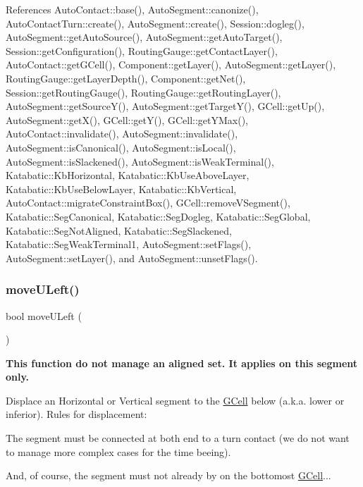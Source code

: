 References Auto\+Contact\+::base(), Auto\+Segment\+::canonize(), Auto\+Contact\+Turn\+::create(), Auto\+Segment\+::create(), Session\+::dogleg(), Auto\+Segment\+::get\+Auto\+Source(), Auto\+Segment\+::get\+Auto\+Target(), Session\+::get\+Configuration(), Routing\+Gauge\+::get\+Contact\+Layer(), Auto\+Contact\+::get\+G\+Cell(), Component\+::get\+Layer(), Auto\+Segment\+::get\+Layer(), Routing\+Gauge\+::get\+Layer\+Depth(), Component\+::get\+Net(), Session\+::get\+Routing\+Gauge(), Routing\+Gauge\+::get\+Routing\+Layer(), Auto\+Segment\+::get\+Source\+Y(), Auto\+Segment\+::get\+Target\+Y(), G\+Cell\+::get\+Up(), Auto\+Segment\+::get\+X(), G\+Cell\+::get\+Y(), G\+Cell\+::get\+Y\+Max(), Auto\+Contact\+::invalidate(), Auto\+Segment\+::invalidate(), Auto\+Segment\+::is\+Canonical(), Auto\+Segment\+::is\+Local(), Auto\+Segment\+::is\+Slackened(), Auto\+Segment\+::is\+Weak\+Terminal(), Katabatic\+::\+Kb\+Horizontal, Katabatic\+::\+Kb\+Use\+Above\+Layer, Katabatic\+::\+Kb\+Use\+Below\+Layer, Katabatic\+::\+Kb\+Vertical, Auto\+Contact\+::migrate\+Constraint\+Box(), G\+Cell\+::remove\+V\+Segment(), Katabatic\+::\+Seg\+Canonical, Katabatic\+::\+Seg\+Dogleg, Katabatic\+::\+Seg\+Global, Katabatic\+::\+Seg\+Not\+Aligned, Katabatic\+::\+Seg\+Slackened, Katabatic\+::\+Seg\+Weak\+Terminal1, Auto\+Segment\+::set\+Flags(), Auto\+Segment\+::set\+Layer(), and Auto\+Segment\+::unset\+Flags().

\mbox{\label{classKatabatic_1_1AutoVertical_a1fa2421b74bf0eb934b7002fd3da2321}} 
\subsubsection{\texorpdfstring{move\+U\+Left()}{moveULeft()}}
{\footnotesize\ttfamily bool move\+U\+Left (\begin{DoxyParamCaption}{ }\end{DoxyParamCaption})\hspace{0.3cm}{\ttfamily [virtual]}}

{\bfseries This function do not manage an aligned set. It applies on {\ttfamily this} segment only.}

Displace an Horizontal or Vertical segment to the \mbox{\hyperlink{classKatabatic_1_1GCell}{G\+Cell}} below (a.\+k.\+a. lower or inferior). Rules for displacement\+:
\begin{DoxyItemize}
\item The segment must be connected at both end to a turn contact (we do not want to manage more complex cases for the time beeing).
\item And, of course, the segment must not already by on the bottomost \mbox{\hyperlink{classKatabatic_1_1GCell}{G\+Cell}}...
\end{DoxyItemize}

